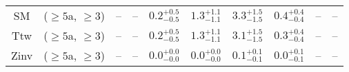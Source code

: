 \begin{table}[h!]
{\begin{tabular}{cccccccccc}
	SM & ($\ge5$a, $\ge3$) & -- & -- & $0.2^{+ 0.5 }_{- 0.5 }$ & $1.3^{+ 1.1 }_{- 1.1 }$ & $3.3^{+ 1.5 }_{- 1.5 }$ & $0.4^{+ 0.4 }_{- 0.4 }$ & -- & -- \\[0.5ex] 
	Ttw & ($\ge5$a, $\ge3$) & -- & -- & $0.2^{+ 0.5 }_{- 0.5 }$ & $1.3^{+ 1.1 }_{- 1.1 }$ & $3.1^{+ 1.5 }_{- 1.5 }$ & $0.3^{+ 0.4 }_{- 0.4 }$ & -- & -- \\[0.5ex] 
	Zinv & ($\ge5$a, $\ge3$) & -- & -- & $0.0^{+ 0.0 }_{- 0.0 }$ & $0.0^{+ 0.0 }_{- 0.0 }$ & $0.1^{+ 0.1 }_{- 0.1 }$ & $0.0^{+ 0.1 }_{- 0.1 }$ & -- & -- \\[0.5ex] 
	\hline
	\hline
\end{tabular}}
\end{table}
